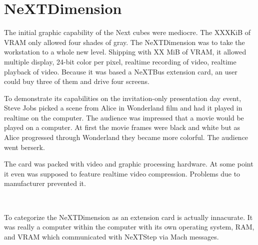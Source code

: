 \section{NeXTDimension}
The initial graphic capability of the Next cubes were mediocre. The XXXKiB of VRAM only allowed four shades of gray. The NeXTDimension was to take the workstation to a whole new level. Shipping with XX MiB of VRAM, it allowed multiple display, 24-bit color per pixel, realtime recording of video, realtime playback of video. Because it was based a NeXTBus extension card, an user could buy three of them and drive four screens.\\
\par
To demonstrate its capabilities on the invitation-only presentation day event, Steve Jobs picked a scene from Alice in Wonderland film and had it played in realtime on the computer. The audience was impressed that a movie would be played on a computer. At first the movie frames were black and white but as Alice progressed through Wonderland they became more colorful. The audience went berserk.\\
\par
The card was packed with video and graphic processing hardware. At some point it even was supposed to feature realtime video compression. Problems due to manufacturer prevented it.\\
\par
{}\\
\par
To categorize the NeXTDimension as an extension card is actually innacurate. It was really a computer within the computer with its own operating system, RAM, and VRAM which communicated with NeXTStep via Mach messages.\\
\par
{}
